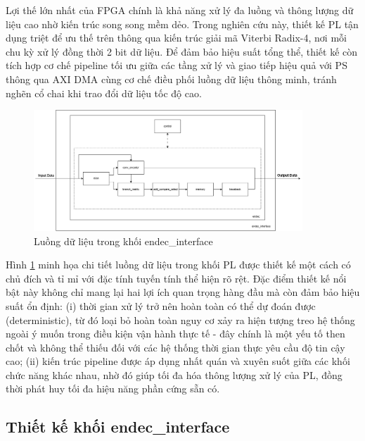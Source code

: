 \documentclass[../DoAn.tex]{subfiles}
\begin{document}
Lợi thế lớn nhất của FPGA chính là khả năng xử lý đa luồng và thông lượng dữ liệu cao nhờ kiến trúc song song mềm dẻo. Trong nghiên cứu này, thiết kế PL tận dụng triệt để ưu thế trên thông qua kiến trúc giải mã Viterbi Radix-4, nơi mỗi chu kỳ xử lý đồng thời 2 bit dữ liệu. Để đảm bảo hiệu suất tổng thể, thiết kế còn tích hợp cơ chế pipeline tối ưu giữa các tầng xử lý và giao tiếp hiệu quả với PS thông qua AXI DMA cùng cơ chế điều phối luồng dữ liệu thông minh, tránh nghẽn cổ chai khi trao đổi dữ liệu tốc độ cao.

\begin{figure}[H]
    \centering
    \includegraphics[width=0.9\textwidth, height=0.7\textheight, keepaspectratio]{Hinhve/Chuong 4/Endec data flow.png}
    \caption{Luồng dữ liệu trong khối endec\_interface}
    \label{fig:Luồng dữ liệu trong khối endec_interface}
\end{figure}

Hình \ref{fig:Luồng dữ liệu trong khối endec_interface} minh họa chi tiết luồng dữ liệu trong khối PL được thiết kế một cách có chủ đích và tỉ mỉ với đặc tính tuyến tính thể hiện rõ rệt. Đặc điểm thiết kế nổi bật này không chỉ mang lại hai lợi ích quan trọng hàng đầu mà còn đảm bảo hiệu suất ổn định: (i) thời gian xử lý trở nên hoàn toàn có thể dự đoán được (deterministic), từ đó loại bỏ hoàn toàn nguy cơ xảy ra hiện tượng treo hệ thống ngoài ý muốn trong điều kiện vận hành thực tế - đây chính là một yếu tố then chốt và không thể thiếu đối với các hệ thống thời gian thực yêu cầu độ tin cậy cao; (ii) kiến trúc pipeline được áp dụng nhất quán và xuyên suốt giữa các khối chức năng khác nhau, nhờ đó giúp tối đa hóa thông lượng xử lý của PL, đồng thời phát huy tối đa hiệu năng phần cứng sẵn có.


\subsection{Thiết kế khối endec\_interface}
\label{subsection:Thiết kế khối endec_interface}
\end{document}
